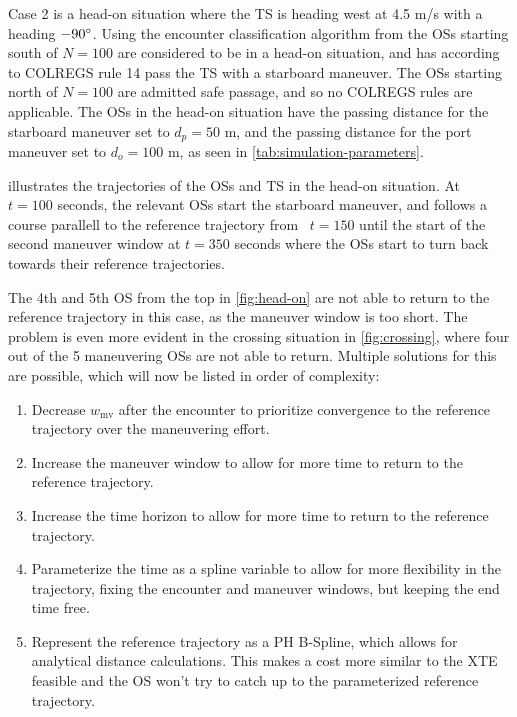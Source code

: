 Case 2 is a head-on situation where the TS is heading west at 4.5 m/s with a heading $-90\degree$. Using the encounter classification algorithm from \cite{Thyri2022-Confined-Waters} the OSs starting south of $N=100$ are considered to be in a head-on situation, and has according to COLREGS rule 14 pass the TS with a starboard maneuver. The OSs starting north of $N=100$ are admitted safe passage, and so no COLREGS rules are applicable. The OSs in the head-on situation have the passing distance for the starboard maneuver set to $d_p=50$ m, and the passing distance for the port maneuver set to $d_o=100$ m, as seen in \cref{tab:simulation-parameters}.  

 illustrates the trajectories of the OSs and TS in the head-on situation. At ~$t=100$ seconds, the relevant OSs start the starboard maneuver, and follows a course parallell to the reference trajectory from ~$t=150$ until the start of the second maneuver window at $t=350$ seconds where the OSs start to turn back towards their reference trajectories. 

The 4th and 5th OS from the top in \cref{fig:head-on} are not able to return to the reference trajectory in this case, as the maneuver window is too short. The problem is even more evident in the crossing situation in \cref{fig:crossing}, where four out of the 5 maneuvering OSs are not able to return. Multiple solutions for this are possible, which will now be listed in order of complexity:
\begin{enumerate}
    \item Decrease $w_\text{mv}$ after the encounter to prioritize convergence to the reference trajectory over the maneuvering effort.
    \item Increase the maneuver window to allow for more time to return to the reference trajectory.
    \item Increase the time horizon to allow for more time to return to the reference trajectory.
    \item Parameterize the time as a spline variable to allow for more flexibility in the trajectory, fixing the encounter and maneuver windows, but keeping the end time free.
    \item Represent the reference trajectory as a PH B-Spline, which allows for analytical distance calculations. This makes a cost more similar to the XTE feasible and the OS won't try to catch up to the parameterized reference trajectory.
\end{enumerate}


